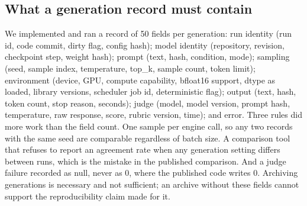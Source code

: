 
\subsection{What a generation record must contain}

We implemented and ran a record of 50 fields per generation: run identity (run id, code commit, dirty flag, config hash); model identity (repository, revision, checkpoint step, weight hash); prompt (text, hash, condition, mode); sampling (seed, sample index, temperature, top\_k, sample count, token limit); environment (device, GPU, compute capability, bfloat16 support, dtype as loaded, library versions, scheduler job id, deterministic flag); output (text, hash, token count, stop reason, seconds); judge (model, model version, prompt hash, temperature, raw response, score, rubric version, time); and error. Three rules did more work than the field count. One sample per engine call, so any two records with the same seed are comparable regardless of batch size. A comparison tool that refuses to report an agreement rate when any generation setting differs between runs, which is the mistake in the published comparison. And a judge failure recorded as null, never as 0, where the published code writes 0. Archiving generations is necessary and not sufficient; an archive without these fields cannot support the reproducibility claim made for it.
